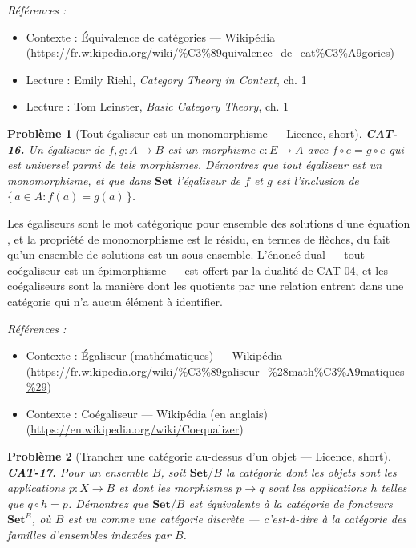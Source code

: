 \documentclass[11pt]{article}
\newtheorem{problem}{Problème}
\newenvironment{refs}{\par\small\noindent\emph{Références :}\begin{itemize}\setlength\itemsep{0pt}}{\end{itemize}\normalsize}
\begin{document}
\begin{refs}
\item Contexte : Équivalence de catégories --- Wikipédia (\url{https://fr.wikipedia.org/wiki/%C3%89quivalence_de_cat%C3%A9gories})
\item Lecture : Emily Riehl, \textit{Category Theory in Context}, ch. 1
\item Lecture : Tom Leinster, \textit{Basic Category Theory}, ch. 1
\end{refs}

\bigskip

\begin{problem}[{Tout égaliseur est un monomorphisme --- Licence, short}]
\textbf{CAT-16.} Un \textit{égaliseur} de $ f, g\colon A \to B $ est un morphisme
$ e\colon E \to A $ avec $ f \circ e = g \circ e $ qui est universel parmi de tels morphismes.
Démontrez que tout égaliseur est un monomorphisme, et que dans $ \mathbf{Set} $ l'égaliseur de
$ f $ et $ g $ est l'inclusion de $ \{\, a \in A : f(a) = g(a) \,\} $.
\end{problem}

\noindent Les égaliseurs sont le mot catégorique pour \og{} ensemble des solutions d'une
équation \fg{}, et la propriété de monomorphisme est le résidu, en termes de flèches, du fait qu'un
ensemble de solutions est un sous-ensemble. L'énoncé dual --- tout coégaliseur est un épimorphisme ---
est offert par la dualité de CAT-04, et les coégaliseurs sont la manière dont les quotients par
une relation entrent dans une catégorie qui n'a aucun élément à identifier.

\begin{refs}
\item Contexte : Égaliseur (mathématiques) --- Wikipédia (\url{https://fr.wikipedia.org/wiki/%C3%89galiseur_%28math%C3%A9matiques%29})
\item Contexte : Coégaliseur --- Wikipédia (en anglais) (\url{https://en.wikipedia.org/wiki/Coequalizer})
\end{refs}

\bigskip

\begin{problem}[{Trancher une catégorie au-dessus d'un objet --- Licence, short}]
\textbf{CAT-17.} Pour un ensemble $ B $, soit $ \mathbf{Set}/B $ la catégorie
dont les objets sont les applications $ p\colon X \to B $ et dont les morphismes $ p \to q $ sont
les applications $ h $ telles que $ q \circ h = p $. Démontrez que $ \mathbf{Set}/B $ est
équivalente à la catégorie de foncteurs $ \mathbf{Set}^{B} $, où $ B $ est vu comme une catégorie
discrète --- c'est-à-dire à la catégorie des familles d'ensembles indexées par $ B $.
\end{problem}
\end{document}
